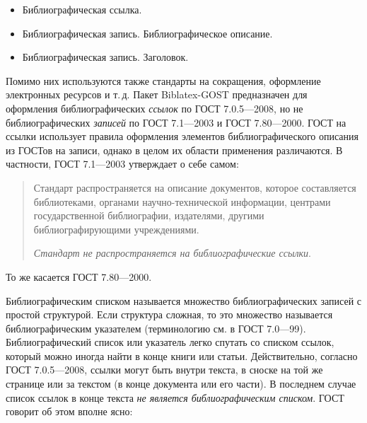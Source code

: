 \documentclass[10pt,a4paper,headings=small,numbers=enddot,english,russian]{ltxdockit}
\newcommand*{\biblatexgost}{Biblatex-GOST\xspace}
\newcommand*{\gostbibname}[1][]{ГОСТ#1 7.1---2003\xspace}
\newcommand*{\gostcitename}[1][]{ГОСТ#1 7.0.5---2008\xspace}
\newcommand*{\gostheadname}[1][]{ГОСТ#1 7.80---2000\xspace}
\begin{document}
\newlength{\templ}\settowidth{\templ}{\gostcitename~}
\begin{itemize}[labelwidth=\templ,leftmargin=!,align=left,noitemsep]
  \item[\gostcitename] Библиографическая ссылка.
  \item[\gostbibname] Библиографическая запись. Библиографическое описание.
  \item[\gostheadname] Библиографическая запись. Заголовок.
\end{itemize}
Помимо них используются также стандарты на сокращения, оформление электронных ресурсов и т.\,д.
Пакет \biblatexgost предназначен для оформления библиографических \emph{ссылок} по \gostcitename,
  но не библиографических \emph{записей} по \gostbibname и \gostheadname.
ГОСТ на ссылки использует правила оформления элементов библиографического описания из
  ГОСТов на записи, однако в целом их области применения различаются.
В частности, \gostbibname утверждает о себе самом:

\begin{quotation}
Стандарт распространяется на описание документов, которое составляется библиотеками,
  органами научно-технической информации, центрами государственной библиографии, издателями,
  другими библиографирующими учреждениями.

\emph{Стандарт не распространяется на библиографические ссылки}.
\end{quotation}
То же касается \gostheadname.

Библиографическим списком называется множество библиографических записей с простой структурой.
Если структура сложная, то это множество называется библиографическим указателем
  (терминологию см. в ГОСТ 7.0---99).
Библиографический список или указатель легко спутать со списком ссылок, который можно
  иногда найти в конце книги или статьи.
Действительно, согласно \gostcitename, ссылки могут быть внутри текста, в сноске на той же странице 
  или за текстом (в конце документа или его части).
В последнем случае список ссылок в конце текста \emph{не является библиографическим списком}.
ГОСТ говорит об этом вполне ясно:
\end{document}
